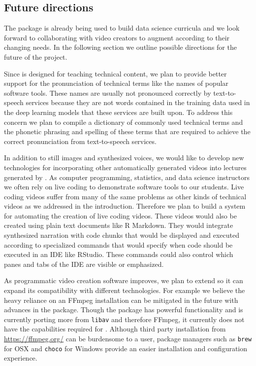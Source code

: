 \hypertarget{future-directions}{%
\subsection{Future directions}\label{future-directions}}

The  package is already being used to build data science
curricula \citep{Kross-2019} and we look forward to collaborating with
video creators to augment  according to their changing needs.
In the following section we outline possible directions for the future
of the project.

Since  is designed for teaching technical content, we plan to
provide better support for the pronunciation of technical terms like the
names of popular software tools. These names are usually not pronounced
correctly by text-to-speech services because they are not words
contained in the training data used in the deep learning models that
these services are built upon. To address this concern we plan to
compile a dictionary of commonly used technical terms and the phonetic
phrasing and spelling of these terms that are required to achieve the
correct pronunciation from text-to-speech services.

In addition to still images and synthesized voices, we would like to
develop new technologies for incorporating other automatically generated
videos into lectures generated by . As computer programming,
statistics, and data science instructors we often rely on live coding
\citep{ChenLAS2019} to demonstrate software tools to our students. Live
coding videos suffer from many of the same problems as other kinds of
technical videos as we addressed in the introduction. Therefore we plan
to build a system for automating the creation of live coding videos.
These videos would also be created using plain text documents like R
Markdown. They would integrate synthesized narration with code chunks
that would be displayed and executed according to specialized commands
that would specify when code should be executed in an IDE like RStudio.
These commands could also control which panes and tabs of the IDE are
visible or emphasized.

As programmatic video creation software improves, we plan to extend
 so it can expand its compatibility with different
technologies. For example we believe the heavy reliance on an FFmpeg
installation can be mitigated in the future with advances in the
 package. Though the  package has powerful functionality
and is currently porting more from \texttt{libav} and therefore FFmpeg,
it currently does not have the capabilities required for .
Although third party installation from \url{https://ffmpeg.org/} can be
burdensome to a user, package managers such as \texttt{brew} for OSX and
\texttt{choco} for Windows provide an easier installation and
configuration experience.

